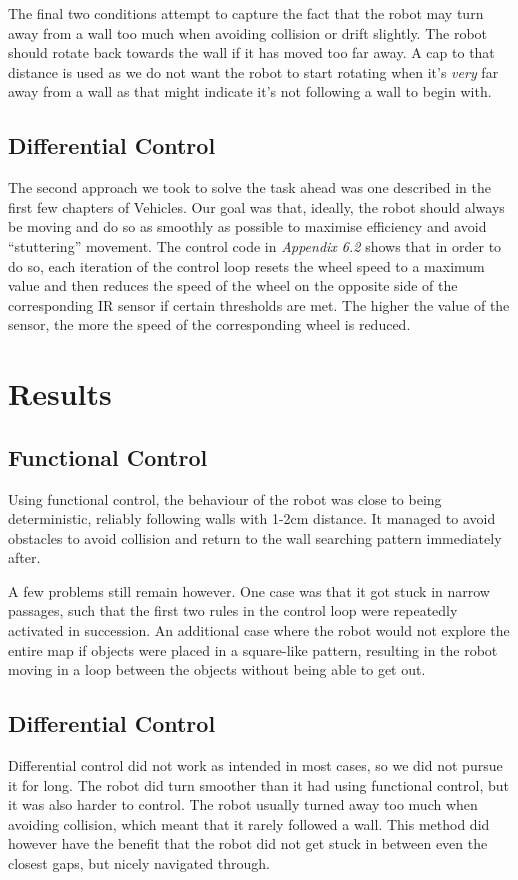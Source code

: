 \documentclass[paper=a4, fontsize=12pt]{scrartcl}	%
\numberwithin{equation}{section}		%
\numberwithin{figure}{section}			%
\numberwithin{table}{section}				%
\begin{document}
The final two conditions attempt to capture the fact that the robot may turn away from a wall too much when avoiding collision or drift slightly. The robot should rotate back towards the wall if it has moved too far away. A cap to that distance is used as we do not want the robot to start rotating when it's \emph{very} far away from a wall as that might indicate it's not following a wall to begin with.
\subsection{Differential Control}
The second approach we took to solve the task ahead was one described in the first few chapters of Vehicles\cite{vehicles}. Our goal was that, ideally, the robot should always be moving and do so as smoothly as possible to maximise efficiency and avoid ``stuttering'' movement. The control code in \emph{Appendix 6.2} shows that in order to do so, each iteration of the control loop resets the wheel speed to a maximum value and then reduces the speed of the wheel on the opposite side of the corresponding IR sensor if certain thresholds are met. The higher the value of the sensor, the more the speed of the corresponding wheel is reduced.
\section{Results}
\subsection{Functional Control}
Using functional control, the behaviour of the robot was close to being deterministic, reliably following walls with 1-2cm distance. It managed to avoid obstacles to avoid collision and return to the wall searching pattern immediately after.

A few problems still remain however. One case was that it got stuck in narrow passages, such that the first two rules in the control loop were repeatedly activated in succession. An additional case where the robot would not explore the entire map if objects were placed in a square-like pattern, resulting in the robot moving in a loop between the objects without being able to get out.
\subsection{Differential Control}
Differential control did not work as intended in most cases, so we did not pursue it for long. The robot did turn smoother than it had using functional control, but it was also harder to control. The robot usually turned away too much when avoiding collision, which meant that it rarely followed a wall. This method did however have the benefit that the robot did not get stuck in between even the closest gaps, but nicely navigated through.
\end{document}
